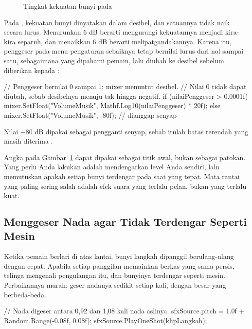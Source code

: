 \begin{figure}[htbp]
\centering

\caption{Tingkat kekuatan bunyi pada }
\label{fig:hierarki-volume}
\end{figure}

Pada , kekuatan bunyi dinyatakan dalam desibel, dan satuannya
tidak naik secara lurus. Menurunkan 6 dB berarti mengurangi kekuatannya menjadi
kira-kira separuh, dan menaikkan 6 dB berarti melipatgandakannya. Karena itu,
penggeser pada menu pengaturan sebaiknya tetap bernilai lurus dari nol sampai
satu, sebagaimana yang dipahami pemain, lalu diubah ke desibel sebelum
diberikan kepada :

\begin{kodekeluaran}
// Penggeser bernilai 0 sampai 1; mixer menuntut desibel.
// Nilai 0 tidak dapat diubah, sebab desibelnya menuju tak hingga negatif.
if (nilaiPenggeser > 0.0001f)
    mixer.SetFloat("VolumeMusik", Mathf.Log10(nilaiPenggeser) * 20f);
else
    mixer.SetFloat("VolumeMusik", -80f);   // dianggap senyap
\end{kodekeluaran}

Nilai $-80$ dB dipakai sebagai pengganti senyap, sebab itulah batas terendah
yang masih diterima .

\begin{tipsbox}
Angka pada Gambar~\ref{fig:hierarki-volume} dapat dipakai sebagai titik awal,
bukan sebagai patokan. Yang perlu Anda lakukan adalah mendengarkan level Anda
sendiri, lalu memutuskan apakah setiap bunyi terdengar pada saat yang tepat.
Mata rantai yang paling sering salah adalah efek suara yang terlalu pelan,
bukan yang terlalu kuat.
\end{tipsbox}

\subsection{Menggeser Nada agar Tidak Terdengar Seperti Mesin}

Ketika pemain berlari di atas lantai, bunyi langkah dipanggil berulang-ulang
dengan cepat. Apabila setiap panggilan memainkan berkas yang sama persis,
telinga mengenali pengulangan itu, dan bunyinya terdengar seperti mesin.
Perbaikannya murah: geser nadanya sedikit setiap kali, dengan besar yang
berbeda-beda.

\begin{kodekeluaran}
// Nada digeser antara 0,92 dan 1,08 kali nada aslinya.
sfxSource.pitch = 1.0f + Random.Range(-0.08f, 0.08f);
sfxSource.PlayOneShot(klipLangkah);
\end{kodekeluaran}


